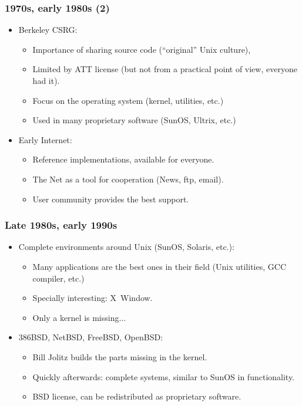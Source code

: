 \begin{frame}
 \frametitle{1970s, early 1980s (2)}

 \begin{itemize}
 \item Berkeley CSRG:
   \begin{itemize}
   \item Importance of sharing source code (``original'' Unix culture),
   \item Limited by ATT license (but not from a practical point of
     view, everyone had it).
   \item Focus on the operating system (kernel, utilities, etc.)
   \item Used in many proprietary software (SunOS, Ultrix, etc.)
   \end{itemize}
 \item Early Internet:
   \begin{itemize}
   \item Reference implementations, available for everyone.
   \item The Net as a tool for cooperation (News, ftp, email).
   \item User community provides the best support.
   \end{itemize}
 \end{itemize}

 \end{frame}


 \begin{frame}
 \frametitle{Late 1980s, early 1990s}

 \begin{itemize}
 \item Complete environments around Unix (SunOS, Solaris, etc.):
   \begin{itemize}
   \item Many applications are the best ones in their field (Unix
     utilities, GCC compiler, etc.)
   \item Specially interesting: X~Window.
   \item Only a kernel is missing...
   \end{itemize}
 \item 386BSD, NetBSD, FreeBSD, OpenBSD:
   \begin{itemize}
   \item Bill Jolitz builds the parts missing in the kernel.
   \item Quickly afterwards: complete systems, similar to SunOS in
     functionality.
   \item BSD license, can be redistributed as proprietary software.
   \end{itemize}
 \end{itemize}

 \end{frame}


